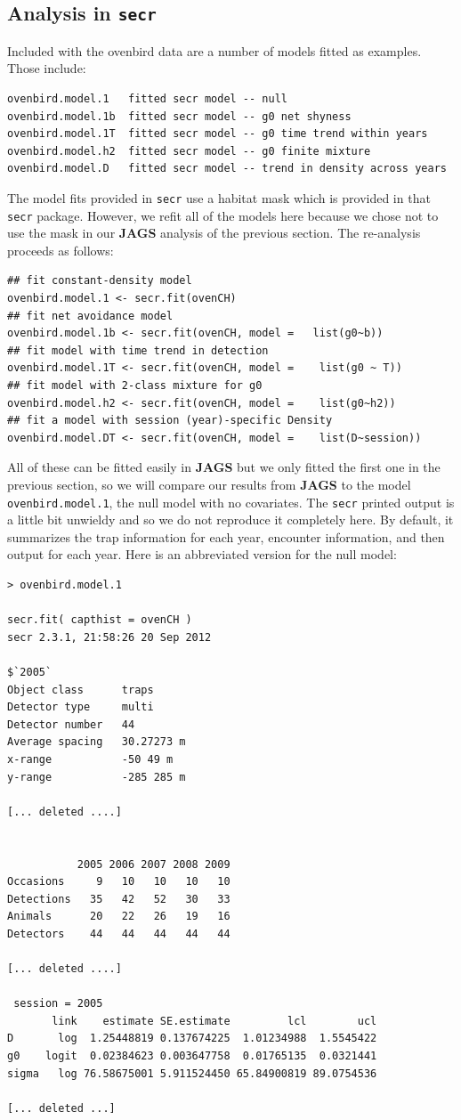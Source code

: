 \subsection{Analysis in \mbox{\tt secr} }


Included with the ovenbird data are a number of  models fitted as
examples. Those include:
{\small
\begin{verbatim}
ovenbird.model.1   fitted secr model -- null
ovenbird.model.1b  fitted secr model -- g0 net shyness
ovenbird.model.1T  fitted secr model -- g0 time trend within years
ovenbird.model.h2  fitted secr model -- g0 finite mixture
ovenbird.model.D   fitted secr model -- trend in density across years
\end{verbatim}
}
The model fits provided in \mbox{\tt secr} use a habitat mask which is
provided in that \mbox{\tt secr} package. 
However, we
refit all of the models here because we chose not to use the mask in
our {\bf JAGS} analysis of the previous section. 
The re-analysis proceeds as follows:
{\small 
\begin{verbatim}
## fit constant-density model
ovenbird.model.1 <- secr.fit(ovenCH)
## fit net avoidance model
ovenbird.model.1b <- secr.fit(ovenCH, model =   list(g0~b))
## fit model with time trend in detection
ovenbird.model.1T <- secr.fit(ovenCH, model =    list(g0 ~ T))
## fit model with 2-class mixture for g0
ovenbird.model.h2 <- secr.fit(ovenCH, model =    list(g0~h2))
## fit a model with session (year)-specific Density
ovenbird.model.DT <- secr.fit(ovenCH, model =    list(D~session))
\end{verbatim}
}

All of these can be fitted easily in {\bf JAGS} but 
we only fitted the first one in the previous section, so we will
compare our results from {\bf JAGS} to the 
model {\tt ovenbird.model.1}, the null model with no covariates.
The \mbox{\tt secr} printed output is a little bit unwieldy and so we
do not reproduce it completely here. By default, it summarizes the
trap information for each year, encounter information, and then output for
each year. Here is an abbreviated version for the null model:
{\small
\begin{verbatim}
> ovenbird.model.1

secr.fit( capthist = ovenCH )
secr 2.3.1, 21:58:26 20 Sep 2012

$`2005`
Object class      traps 
Detector type     multi 
Detector number   44 
Average spacing   30.27273 m 
x-range           -50 49 m 
y-range           -285 285 m 

[... deleted ....]


           2005 2006 2007 2008 2009
Occasions     9   10   10   10   10
Detections   35   42   52   30   33
Animals      20   22   26   19   16
Detectors    44   44   44   44   44

[... deleted ....]

 session = 2005 
       link    estimate SE.estimate         lcl        ucl
D       log  1.25448819 0.137674225  1.01234988  1.5545422
g0    logit  0.02384623 0.003647758  0.01765135  0.0321441
sigma   log 76.58675001 5.911524450 65.84900819 89.0754536

[... deleted ...]
\end{verbatim}
}

